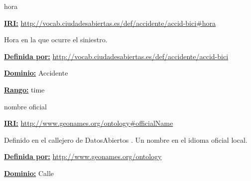 \begin{mybox}{hora}
\begin{flushleft}
\underline{\textbf{IRI:}}
\url{http://vocab.ciudadesabiertas.es/def/accidente/accid-bici#hora}
\newline

Hora en la que ocurre el siniestro.
\newline

\underline{\textbf{Definida por:}}
\url{http://vocab.ciudadesabiertas.es/def/accidente/accid-bici}
\newline

\underline{\textbf{Dominio:}} 
\newline Accidente
\newline

\underline{\textbf{Rango:}} 
\newline time

\end{flushleft}
\end{mybox}



\begin{mybox}{nombre oficial}
\begin{flushleft}
\underline{\textbf{IRI:}}
\url{http://www.geonames.org/ontology#officialName}
\newline

Definido en el callejero de DatosAbiertos \cite{ciudadesbiertas_callejero}.
Un nombre en el idioma oficial local.
\newline


\underline{\textbf{Definida por:}}
\url{http://www.geonames.org/ontology}
\newline

\underline{\textbf{Dominio:}}
	Calle
\newline


\end{flushleft}
\end{mybox}




